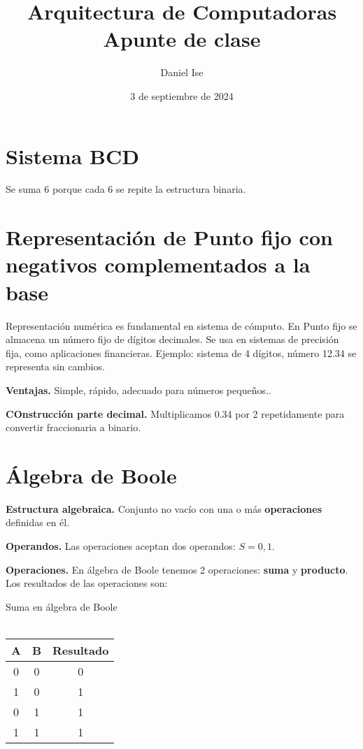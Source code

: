 \documentclass{article}
\title{Arquitectura de Computadoras\\Apunte de clase}
\author{Daniel Ise}
\date{3 de septiembre de 2024}
\begin{document}
\maketitle

\section*{Sistema BCD}

Se suma 6 porque cada 6 se repite la estructura binaria.

\section*{Representación de Punto fijo con negativos complementados a la base}

Representación numérica es fundamental en sistema de cómputo.
En Punto fijo se almacena un número fijo de dígitos decimales.
Se usa en sistemas de precisión fija, como aplicaciones financieras.
Ejemplo: sistema de 4 dígitos, número 12.34 se representa sin cambios.

\textbf{Ventajas.}
Simple, rápido, adecuado para números pequeños..

\textbf{COnstrucción parte decimal.}
Multiplicamos 0.34 por 2 repetidamente para convertir fraccionaria a binario.

\section*{Álgebra de Boole}

\textbf{Estructura algebraica.}
Conjunto no vacío con una o más \textbf{operaciones} definidas en él.

\textbf{Operandos.}
Las operaciones aceptan dos operandos: \(S = {0,1}\).

\textbf{Operaciones.}
En álgebra de Boole tenemos 2 operaciones:
\textbf{suma} y \textbf{producto}.
Los resultados de las operaciones son:

\begin{center}
    Suma en álgebra de Boole\\
    \hfill \\
    \begin{tabular}{ c c c }
        A & B & Resultado \\
        \hline
        0 & 0 & 0         \\
        1 & 0 & 1         \\
        0 & 1 & 1         \\
        1 & 1 & 1         \\
        \hline
    \end{tabular}
\end{center}
\end{document}
